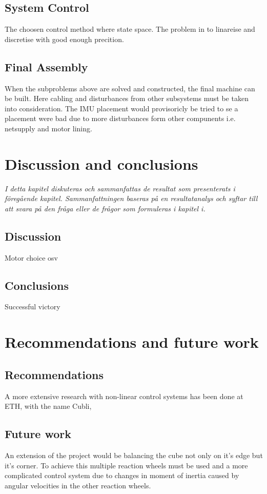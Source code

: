 \documentclass[a4paper,11pt]{kth-mag}
\begin{document}
\section{System Control}
The choosen control method where state space. The problem in to linareise and discretise with good enough precition.

\section{Final Assembly}
When the subproblems above are solved and constructed, the final machine can be built. Here cabling and disturbances from other subsystems must be taken into consideration. 
The IMU placement would provisoricly be tried to se a placement were bad due to more disturbances form other compunents i.e. netsupply and motor lining.

\chapter{Discussion and conclusions}
\emph{I detta kapitel diskuteras och sammanfattas de resultat som presenterats i föregående kapitel. Sammanfattningen baseras på en resultatanalys och syftar till att svara på den fråga eller de frågor som formuleras i kapitel i.}

\section{Discussion}
Motor choice osv

\section{Conclusions}
Successful victory


\chapter{Recommendations and future work}

\section{Recommendations}
A more extensive research with non-linear control systems has been done at ETH, with the name Cubli,\cite{cubliECC13}

\section{Future work}
An extension of the project would be balancing the cube not only on it's edge but it's corner. To achieve this multiple reaction wheels must be used and a more complicated control system due to changes in moment of inertia caused by angular velocities in the other reaction wheels.
\end{document}
